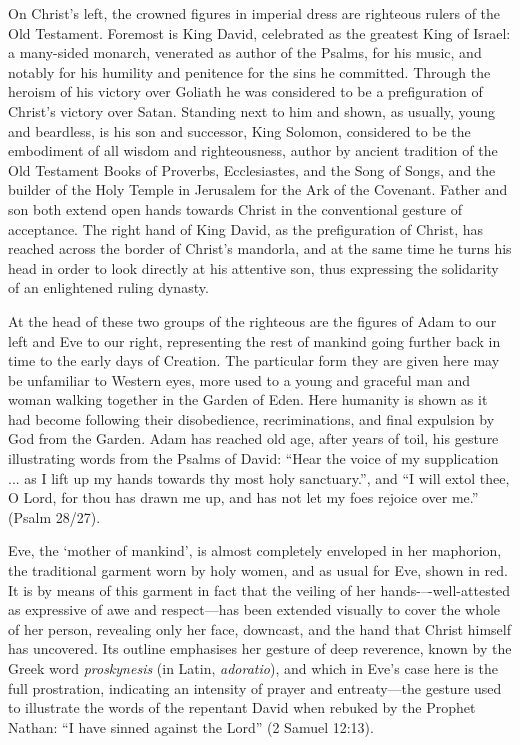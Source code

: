 \documentclass[a4paper,12pt]{article}
\begin{document}
On Christ’s left, the crowned figures in imperial dress are righteous
rulers of the Old Testament.  Foremost is King David, celebrated as
the greatest King of Israel: a many-sided monarch, venerated as author
of the Psalms, for his music, and notably for his humility and
penitence for the sins he committed.  Through the heroism of his
victory over Goliath he was considered to be a prefiguration of
Christ’s victory over Satan.  Standing next to him and shown, as
usually, young and beardless, is his son and successor, King Solomon,
considered to be the embodiment of all wisdom and righteousness,
author by ancient tradition of the Old Testament Books of Proverbs,
Ecclesiastes, and the Song of Songs, and the builder of the Holy
Temple in Jerusalem for the Ark of the Covenant.  Father and son both
extend open hands towards Christ in the conventional gesture of
acceptance.  The right hand of King David, as the prefiguration of
Christ, has reached across the border of Christ’s mandorla, and at the
same time he turns his head in order to look directly at his attentive
son, thus expressing the solidarity of an enlightened ruling dynasty.

At the head of these two groups of the righteous are the figures of
Adam to our left and Eve to our right, representing the rest of
mankind going further back in time to the early days of Creation.  The
particular form they are given here may be unfamiliar to Western eyes,
more used to a young and graceful man and woman walking together in
the Garden of Eden.  Here humanity is shown as it had become following
their disobedience, recriminations, and final expulsion by God from
the Garden.  Adam has reached old age, after years of toil, his
gesture illustrating words from the Psalms of David: ``Hear the voice
of my supplication ... as I lift up my hands towards thy most holy
sanctuary.'', and ``I will extol thee, O Lord, for thou has drawn me
up, and has not let my foes rejoice over me.'' (Psalm 28/27).

Eve, the ‘mother of mankind’, is almost completely enveloped in her
maphorion, the traditional garment worn by holy women, and as usual
for Eve, shown in red.  It is by means of this garment in fact that
the veiling of her hands-–-well-attested as expressive of awe and
respect---has been extended visually to cover the whole of her person,
revealing only her face, downcast, and the hand that Christ himself
has uncovered.  Its outline emphasises her gesture of deep reverence,
known by the Greek word {\it proskynesis} (in Latin, {\it adoratio}),
and which in Eve’s case here is the full prostration, indicating an
intensity of prayer and entreaty---the gesture used to illustrate the
words of the repentant David when rebuked by the Prophet Nathan: ``I
have sinned against the Lord'' (2 Samuel 12:13).
\end{document}
